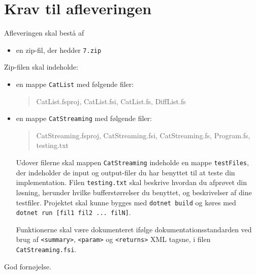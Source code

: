 \documentclass[a4paper,12pt]{article}
\newcommand{\exerciseNumber}{7}
\begin{document}
\section*{Krav til afleveringen}

Afleveringen skal bestå af
\begin{itemize}
  \item en zip-fil, der hedder \texttt{\exerciseNumber\typeLetter.zip}
\end{itemize}
Zip-filen skal indeholde:
\begin{itemize}
\item en mappe \texttt{CatList} med følgende filer:
  \begin{quote}
    CatList.fsproj, CatList.fsi, CatList.fs, DiffList.fs
  \end{quote}
\item en mappe \texttt{CatStreaming} med følgende filer:
  \begin{quote}
    CatStreaming.fsproj, CatStreaming.fsi, CatStreaming.fs, Program.fs, testing.txt
  \end{quote}
  Udover filerne skal mappen \texttt{CatStreaming} indeholde en mappe \texttt{testFiles}, der indeholder de input og output-filer du har benyttet til at teste din implementation. Filen \texttt{testing.txt} skal beskrive hvordan du afprøvet din løsning, herunder hvilke bufferstørrelser du benyttet, og beskrivelser af dine testfiler. 
  Projektet skal kunne bygges med \texttt{dotnet build} og køres med \\ \texttt{dotnet run [fil1 fil2 ... filN]}.
  
  Funktionerne skal være dokumenteret ifølge dokumentationsstandarden ved brug af \verb|<summary>|, \verb|<param>| og \verb|<returns>| XML tagsne, i filen \texttt{CatStreaming.fsi}.
\end{itemize}

\flushright God fornøjelse.
\end{document}
